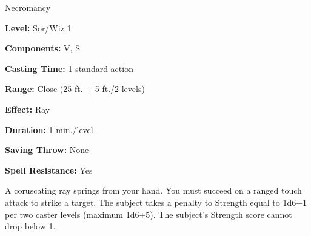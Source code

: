 
Necromancy

\textbf{Level:} Sor/Wiz 1

\textbf{Components:} V, S

\textbf{Casting Time:} 1 standard action

\textbf{Range:} Close (25 ft. + 5 ft./2 levels)

\textbf{Effect:} Ray

\textbf{Duration:} 1 min./level

\textbf{Saving Throw:} None

\textbf{Spell Resistance:} Yes

A coruscating ray springs from your hand. You must succeed on a ranged touch attack 
to strike a target. The subject takes a penalty to Strength equal to 1d6+1 per 
two caster levels (maximum 1d6+5). The subject's Strength score cannot drop below 
1.


